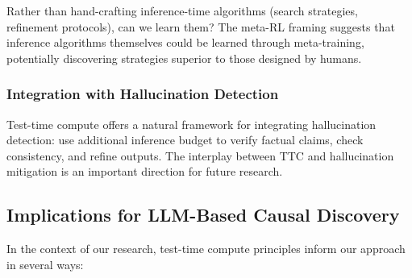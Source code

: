 Rather than hand-crafting inference-time algorithms (search strategies, refinement protocols), can we learn them? The meta-RL framing suggests that inference algorithms themselves could be learned through meta-training, potentially discovering strategies superior to those designed by humans.

\subsubsection{Integration with Hallucination Detection}

Test-time compute offers a natural framework for integrating hallucination detection: use additional inference budget to verify factual claims, check consistency, and refine outputs. The interplay between TTC and hallucination mitigation is an important direction for future research.

\subsection{Implications for LLM-Based Causal Discovery}

In the context of our research, test-time compute principles inform our approach in several ways:

